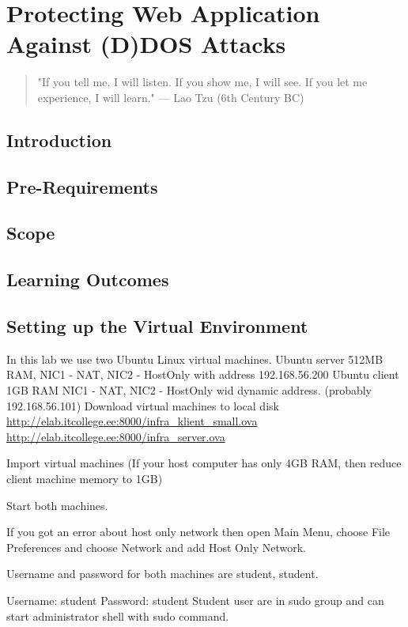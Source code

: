 

\chapter{Protecting Web Application Against (D)DOS Attacks}
\label{Protecting Web Application Against (D)DOS Attacks}

 
\begin{quote}
"If you tell me, I will listen. If you show me, I
will see. If you let me experience, I will learn." --- Lao Tzu (6th Century BC)
\end{quote}

\section{Introduction}
\section{Pre-Requirements} 
\section{Scope}
\section{Learning Outcomes} 
\section{Setting up the Virtual Environment} 

In this lab we use two Ubuntu Linux virtual machines.
Ubuntu server 512MB RAM, NIC1 - NAT, NIC2 - HostOnly with address 192.168.56.200
Ubuntu client 1GB RAM NIC1 - NAT, NIC2 - HostOnly wid dynamic address. (probably 192.168.56.101)
Download virtual machines to local disk
\url{http://elab.itcollege.ee:8000/infra_klient_small.ova}
\url{http://elab.itcollege.ee:8000/infra_server.ova}

Import virtual machines (If your host computer has only 4GB RAM, then reduce client machine memory to 1GB)

Start both machines. 

{\small{If you got an error about host only network then open Main Menu, choose File Preferences and choose Network and add Host Only Network.}}

Username and password for both machines are student, student.

Username: student
Password: student
Student user are in sudo group and can start administrator shell with sudo command.

